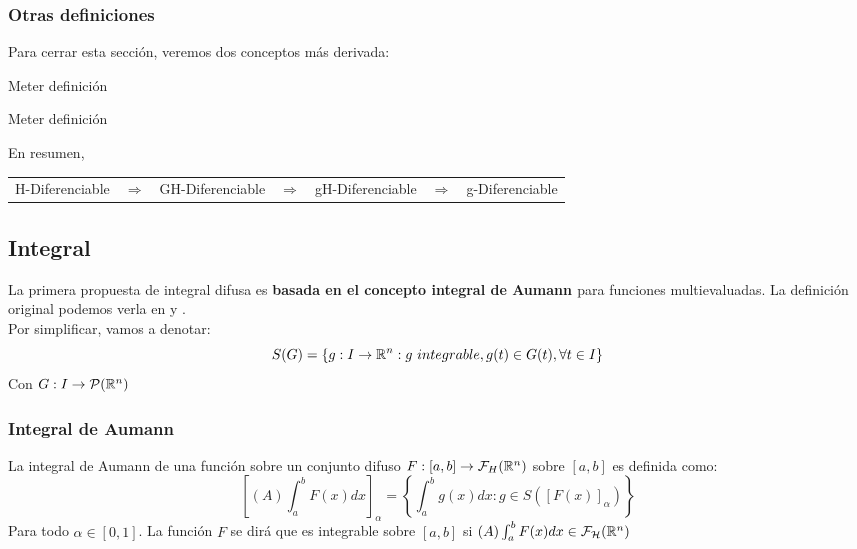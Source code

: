 \subsubsection{Otras definiciones}

Para cerrar esta sección, veremos dos conceptos más derivada:

\begin{definicion}
Meter definición
\end{definicion}

\begin{definicion}
	Meter definición
\end{definicion}

En resumen,
\begin{table}[h]
	\centering
	\begin{tabular}{lllllll}
		H-Diferenciable & $\Rightarrow$ & GH-Diferenciable & $\Rightarrow$ & gH-Diferenciable & $\Rightarrow$ & g-Diferenciable
	\end{tabular}
\end{table}

\subsection{Integral}
La primera propuesta de integral difusa es \textbf{basada en el concepto integral de Aumann \cite{aumannintegral}} para funciones multievaluadas. La definición original podemos verla en \cite{integral1} y \cite{integral2}. \\
Por simplificar, vamos a denotar:
\[
	S(G) = \{g : I \rightarrow \mathbb R^n : g ~ integrable, g(t) \in G(t), \forall t \in I \}
\]
Con $G : I \rightarrow \mathcal{P}(\mathbb R^n)$

\subsubsection{Integral de Aumann}
\begin{definicion}
	La integral de Aumann de una función sobre un conjunto difuso $F : [a, b] \rightarrow \mathcal{F}_H(\mathbb R^n)$ sobre $[a, b]$ es definida como: 
	\[
		\left[
		(A) \int_{a}^{b} F(x) dx
		\right]_\alpha = \left\{
			\int_{a}^{b} g(x) dx : g \in S([F(x)]_\alpha)
		\right\}
	\]
	Para todo $\alpha \in [0, 1]$. La función $F$ se dirá que es integrable sobre $[a, b]$ si $(A) \int_{a}^{b} F(x) dx \in \mathcal{F}_\mathcal{H}(\mathbb R^n)$
\end{definicion}

